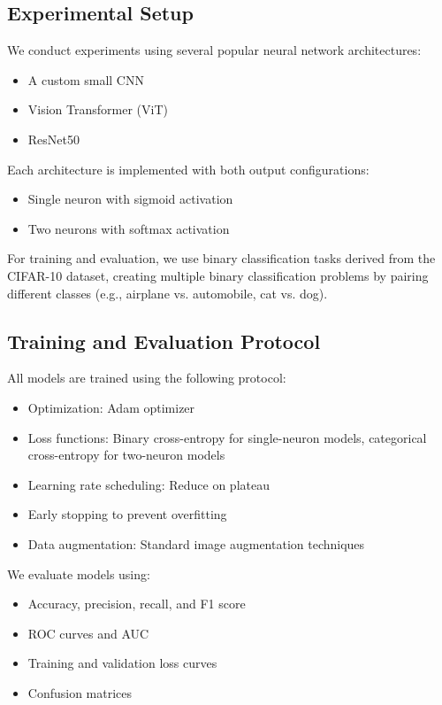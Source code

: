 \documentclass[11pt]{article}
\begin{document}
\subsection{Experimental Setup}
We conduct experiments using several popular neural network architectures:
\begin{itemize}
\item A custom small CNN
\item Vision Transformer (ViT)
\item ResNet50
\end{itemize}

Each architecture is implemented with both output configurations:
\begin{itemize}
\item Single neuron with sigmoid activation
\item Two neurons with softmax activation
\end{itemize}

For training and evaluation, we use binary classification tasks derived from the CIFAR-10 dataset, creating multiple binary classification problems by pairing different classes (e.g., airplane vs. automobile, cat vs. dog).

\subsection{Training and Evaluation Protocol}
All models are trained using the following protocol:
\begin{itemize}
\item Optimization: Adam optimizer
\item Loss functions: Binary cross-entropy for single-neuron models, categorical cross-entropy for two-neuron models
\item Learning rate scheduling: Reduce on plateau
\item Early stopping to prevent overfitting
\item Data augmentation: Standard image augmentation techniques
\end{itemize}

We evaluate models using:
\begin{itemize}
\item Accuracy, precision, recall, and F1 score
\item ROC curves and AUC
\item Training and validation loss curves
\item Confusion matrices
\end{itemize}
\end{document}

